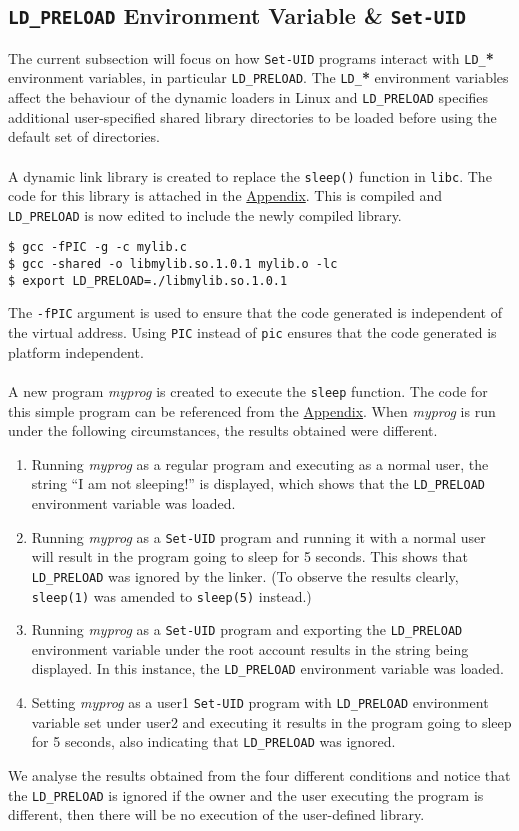 \documentclass[a4paper,12pt]{article}
\begin{document}
\subsection{\texttt{LD\_PRELOAD} Environment Variable \& \texttt{Set-UID}}
The current subsection will focus on how \texttt{Set-UID} programs interact with \texttt{LD\_}\textbf{*} environment variables, in particular \texttt{LD\_PRELOAD}. The \texttt{LD\_}\textbf{*} environment variables affect the behaviour of the dynamic loaders in Linux and \texttt{LD\_PRELOAD} specifies additional user-specified shared library directories to be loaded before using the default set of directories.\\\\
A dynamic link library is created to replace the \texttt{sleep()} function in \texttt{libc}. The code for this library is attached in the \hyperref[Appsec:3.7]{Appendix}. This is compiled and \texttt{LD\_PRELOAD} is now edited to include the newly compiled library.
\begin{verbatim}
$ gcc -fPIC -g -c mylib.c
$ gcc -shared -o libmylib.so.1.0.1 mylib.o -lc
$ export LD_PRELOAD=./libmylib.so.1.0.1
\end{verbatim}
The \texttt{-fPIC} argument is used to ensure that the code generated is independent of the virtual address. Using \texttt{PIC} instead of \texttt{pic} ensures that the code generated is platform independent.\\\\A new program \textit{myprog} is created to execute the \texttt{sleep} function. The code for this simple program can be referenced from the \hyperref[Appsec:3.7.2]{Appendix}. When \textit{myprog} is run under the following circumstances, the results obtained were different.
\begin{enumerate}
	\item Running \textit{myprog} as a regular program and executing as a normal user, the string ``I am not sleeping!'' is displayed, which shows that the \texttt{LD\_PRELOAD} environment variable was loaded.
	\item Running \textit{myprog} as a \texttt{Set-UID} program and running it with a normal user will result in the program going to sleep for 5 seconds. This shows that \texttt{LD\_PRELOAD} was ignored by the linker. (To observe the results clearly, \texttt{sleep(1)} was amended to \texttt{sleep(5)} instead.)
	\item Running \textit{myprog} as a \texttt{Set-UID} program and exporting the \texttt{LD\_PRELOAD} environment variable under the root account results in the string being displayed. In this instance, the \texttt{LD\_PRELOAD} environment variable was loaded.
	\item Setting \textit{myprog} as a user1 \texttt{Set-UID} program with \texttt{LD\_PRELOAD} environment variable set under user2 and executing it results in the program going to sleep for 5 seconds, also indicating that \texttt{LD\_PRELOAD} was ignored.
\end{enumerate}
We analyse the results obtained from the four different conditions and notice that the \texttt{LD\_PRELOAD} is ignored if the owner and the user executing the program is different, then there will be no execution of the user-defined library.
\end{document}
